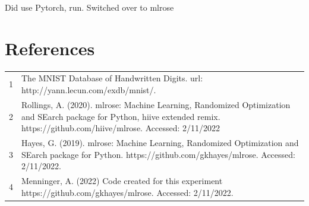 \documentclass[letterpaper]{article} %
\begin{document}
Did use Pytorch, run.  Switched over to mlrose


\section{References}
\begin{tabular}{l p{2.75in}}
\\
1 & The MNIST Database of Handwritten Digits. url: http://yann.lecun.com/exdb/mnist/.
\\
2 & Rollings, A. (2020). mlrose: Machine Learning, Randomized Optimization and SEarch package for Python, hiive extended remix. https://github.com/hiive/mlrose. Accessed: 2/11/2022
\\
3 & Hayes, G. (2019). mlrose: Machine Learning, Randomized Optimization and SEarch package for Python. https://github.com/gkhayes/mlrose. Accessed: 2/11/2022.
\\
4 & Menninger, A. (2022)  Code created for this experiment https://github.com/gkhayes/mlrose. Accessed: 2/11/2022.
\end{tabular}
\end{document}
